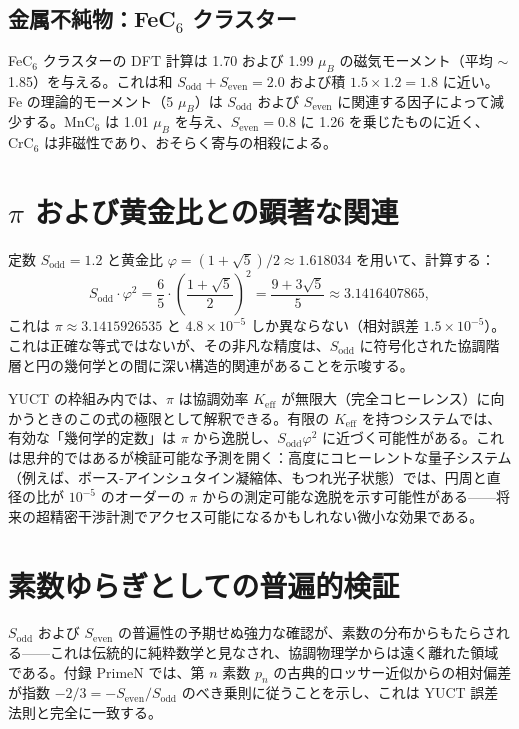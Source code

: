 \documentclass[11pt,a4paper]{article}
\begin{document}
	\subsection{金属不純物：FeC\({}_6\) クラスター}
	FeC\({}_6\) クラスターの DFT 計算は 1.70 および 1.99 \(\mu_B\) の磁気モーメント（平均 \(\sim\)1.85）を与える。これは和 \(S_{\text{odd}}+S_{\text{even}}=2.0\) および積 \(1.5\times1.2=1.8\) に近い。Fe の理論的モーメント（5 \(\mu_B\)）は \(S_{\text{odd}}\) および \(S_{\text{even}}\) に関連する因子によって減少する。MnC\({}_6\) は 1.01 \(\mu_B\) を与え、\(S_{\text{even}}=0.8\) に 1.26 を乗じたものに近く、CrC\({}_6\) は非磁性であり、おそらく寄与の相殺による。
	
	\section{\(\pi\) および黄金比との顕著な関連}
	\label{sec:pi_relation}
	
	定数 \(S_{\text{odd}} = 1.2\) と黄金比 \(\varphi = (1+\sqrt{5})/2 \approx 1.618034\) を用いて、計算する：
	\[
	S_{\text{odd}} \cdot \varphi^2 = \frac{6}{5} \cdot \left(\frac{1+\sqrt{5}}{2}\right)^2 = \frac{9+3\sqrt{5}}{5} \approx 3.1416407865,
	\]
	これは \(\pi \approx 3.1415926535\) と \(4.8\times10^{-5}\) しか異ならない（相対誤差 \(1.5\times10^{-5}\)）。これは正確な等式ではないが、その非凡な精度は、\(S_{\text{odd}}\) に符号化された協調階層と円の幾何学との間に深い構造的関連があることを示唆する。
	
	YUCT の枠組み内では、\(\pi\) は協調効率 \(K_{\text{eff}}\) が無限大（完全コヒーレンス）に向かうときのこの式の極限として解釈できる。有限の \(K_{\text{eff}}\) を持つシステムでは、有効な「幾何学的定数」は \(\pi\) から逸脱し、\(S_{\text{odd}}\varphi^2\) に近づく可能性がある。これは思弁的ではあるが検証可能な予測を開く：高度にコヒーレントな量子システム（例えば、ボース-アインシュタイン凝縮体、もつれ光子状態）では、円周と直径の比が \(10^{-5}\) のオーダーの \(\pi\) からの測定可能な逸脱を示す可能性がある——将来の超精密干渉計測でアクセス可能になるかもしれない微小な効果である。
	
	\section{素数ゆらぎとしての普遍的検証}
	\label{sec:primes}
	
	\(S_{\mathrm{odd}}\) および \(S_{\mathrm{even}}\) の普遍性の予期せぬ強力な確認が、素数の分布からもたらされる——これは伝統的に純粋数学と見なされ、協調物理学からは遠く離れた領域である。付録 PrimeN では、第 \(n\) 素数 \(p_n\) の古典的ロッサー近似からの相対偏差が指数 \(-2/3 = -S_{\mathrm{even}}/S_{\mathrm{odd}}\) のべき乗則に従うことを示し、これは YUCT 誤差法則と完全に一致する。
	
\end{document}
